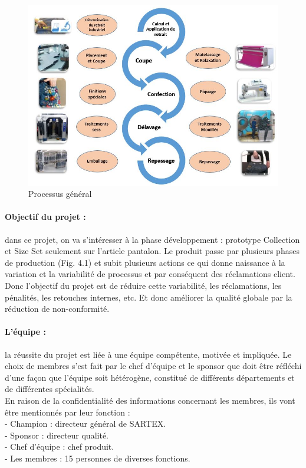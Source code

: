 \documentclass[12pt, a4paper]{thesis}
\begin{document}
\begin{figure}[!h]
\begin{center}
        \includegraphics[scale=0.75]{facteur.JPG}
        \caption{Processus général}
\end{center}
\end{figure}
\paragraph*{\textbf{Objectif du projet} :} dans ce projet, on va s'intéresser à la phase développement : prototype Collection et Size Set seulement sur l'article pantalon. Le produit passe par plusieurs phases de production (Fig. 4.1) et subit plusieurs actions ce qui donne naissance à la variation et la variabilité de processus et par conséquent des réclamations client. Donc l'objectif du projet est de réduire cette variabilité, les réclamations, les pénalités, les retouches internes, etc. Et donc améliorer la qualité globale par la réduction de non-conformité.
\paragraph*{\textbf{L'équipe} :} la réussite du projet est liée à une équipe compétente, motivée et impliquée. Le choix de membres s'est fait par le chef d’équipe et le sponsor que doit être réfléchi d'une façon que l'équipe soit hétérogène, constitué de différents départements et de différentes spécialités.\\
En raison de la confidentialité des informations concernant les membres, ils vont être mentionnés par leur fonction :\\
- Champion : directeur général de SARTEX.\\
- Sponsor : directeur qualité. \\
- Chef d'équipe : chef produit.\\
- Les membres : 15 personnes de diverses fonctions.
\end{document}
